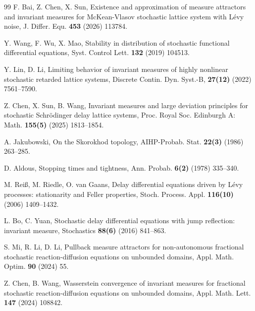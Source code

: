 \documentclass[11pt]{article}
\numberwithin{equation}{section}
\theoremstyle{plain}
\begin{document}
\begin{thebibliography}{99}
	F. Bai, Z. Chen, X. Sun,
	Existence and approximation of measure attractors and invariant measures for McKean-Vlasov stochastic lattice system with L{\'e}vy noise,
	J. Differ. Equ. \textbf{453} (2026) 113784. 
	
	
	Y. Wang, F. Wu, X. Mao,
	Stability in distribution of stochastic functional differential equations,
	Syst. Control Lett. \textbf{132} (2019) 104513.
	
	Y. Lin, D. Li, 
	Limiting behavior of invariant measures of highly nonlinear stochastic retarded lattice systems,
	Discrete Contin. Dyn. Syst.-B, \textbf{27(12)} (2022) 7561--7590. 

    Z. Chen, X. Sun, B. Wang,
    Invariant measures and large deviation principles for stochastic Schr\"{o}dinger delay lattice systems, 
    Proc. Royal Soc. Edinburgh A: Math. \textbf{155(5)} (2025) 1813--1854.	
	


     A. Jakubowski, 
    On the Skorokhod topology,
    AIHP-Probab. Stat. \textbf{22(3)} (1986) 263--285.	

    D. Aldous, 
    Stopping times and tightness, 
    Ann. Probab. \textbf{6(2)} (1978) 335--340.
    

  
 	M. Reiß, M. Riedle, O. van Gaans,
 	Delay differential equations driven by L\'{e}vy processes: stationarity and Feller properties, 
 	Stoch. Process. Appl. \textbf{116(10)} (2006) 1409--1432.
 	
  	 L. Bo, C. Yuan, 
     Stochastic delay differential equations with jump reflection: invariant measure, 
     Stochastics \textbf{88(6)} (2016) 841--863.   
     
 

	S. Mi, R. Li, D. Li, 
	Pullback measure attractors for non-autonomous fractional stochastic reaction-diffusion equations on unbounded domains, 
	Appl. Math. Optim. \textbf{90} (2024) 55.
	
    Z. Chen, B. Wang,  
    Wasserstein convergence of invariant measures for fractional stochastic reaction-diffusion equations on unbounded domains,
    Appl. Math. Lett. \textbf{147} (2024) 108842. 
    

\end{thebibliography}
\end{document}
